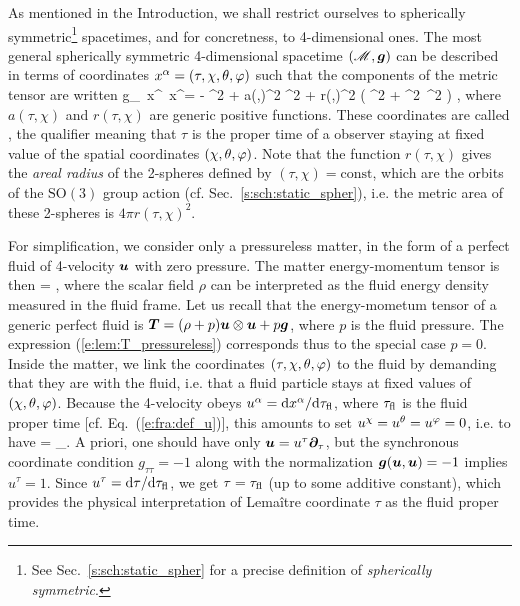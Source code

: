 As mentioned in the Introduction, we shall restrict ourselves to
spherically symmetric\footnote{See Sec.~\ref{s:sch:static_spher} for a precise
definition of \emph{spherically symmetric}.} spacetimes, and for concretness, to 4-dimensional ones. The most general spherically symmetric 4-dimensional spacetime $(\mathscr{M},\bm{g})$
can be described in terms of coordinates $x^\alpha=(\tau,\chi,\theta,\varphi)$ such that
the components of the metric tensor are written
\be \label{e:lem:metric_sync_coord}
    g_{\mu\nu}\, \D x^\mu \, \D x^\nu = - \D\tau^2 + a(\tau,\chi)^2 \D\chi^2
        + r(\tau,\chi)^2 \left( \D\th^2 + \sin^2\th\, \D\ph^2 \right)  ,
\ee
where $a(\tau,\chi)$ and $r(\tau,\chi)$ are generic positive functions.
These coordinates are called , the qualifier
 meaning that $\tau$ is the proper time of a observer staying
at fixed value of the spatial coordinates $(\chi,\theta,\varphi)$.
Note that the function $r(\tau,\chi)$ gives the \emph{areal radius}
of the 2-spheres
defined by $(\tau,\chi) = \mathrm{const}$, which are the orbits of the $\mathrm{SO}(3)$
group action (cf. Sec.~\ref{s:sch:static_spher}), i.e. the metric area of these
2-spheres is $4\pi r(\tau,\chi)^2$.

For simplification, we consider only a pressureless matter, in the form of a perfect
fluid of 4-velocity $\bm{u}$ with zero pressure. The matter energy-momentum tensor is then
\be \label{e:lem:T_pressureless}
     = \rho {} \otimes {} ,
\ee
where the scalar field $\rho$ can be interpreted as the fluid energy density
measured in the fluid frame. Let us recall that the energy-mometum tensor of a generic
perfect fluid is $\bm{T} = (\rho + p)\bm{u} \otimes \bm{u} + p \bm{g}$, where $p$
is the fluid pressure. The expression (\ref{e:lem:T_pressureless}) corresponds thus
to the special case $p=0$.
Inside the matter, we link the coordinates $(\tau,\chi,\theta,\varphi)$ to the fluid by demanding
that they are  with the fluid, i.e. that a fluid particle
stays at fixed values of $(\chi,\theta,\varphi)$.
Because the 4-velocity obeys $u^\alpha = \mathrm{d} x^\alpha/\mathrm{d} \tau_{\rm fl}$, where
$\tau_{\rm fl}$ is the fluid proper time [cf. Eq.~(\ref{e:fra:def_u})], this
amounts to set $u^\chi=u^\theta = u^\varphi = 0$, i.e. to have
\be \label{e:lem:u_par_tau}
     = \wpar_\tau .
\ee
A priori, one should have only $\bm{u} =  u^\tau\bm{\partial}_\tau$, but the
synchronous coordinate condition $g_{\tau\tau} = -1$ along with the
normalization $\bm{g}(\bm{u},\bm{u})=-1$ implies $u^\tau=1$. Since $u^\tau = \mathrm{d}\tau / \mathrm{d}\tau_{\rm fl}$, we get $\tau = \tau_{\rm fl}$ (up to some additive constant), which provides the physical
interpretation of Lemaître coordinate $\tau$ as the fluid proper time.

